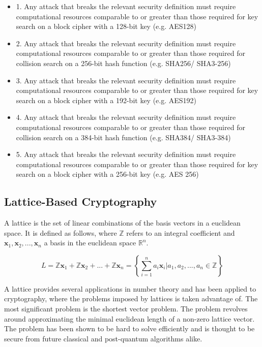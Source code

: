 \begin{itemize}
    \item 1. Any attack that breaks the relevant security definition must require computational resources comparable to or greater than those required for key search on a block cipher with a 128-bit key (e.g. AES128)
    \item 2. Any attack that breaks the relevant security definition must require computational resources comparable to or greater than those required for collision search on a 256-bit hash function (e.g. SHA256/ SHA3-256)
    \item 3. Any attack that breaks the relevant security definition must require computational resources comparable to or greater than those required for key search on a block cipher with a 192-bit key (e.g. AES192)
    \item 4. Any attack that breaks the relevant security definition must require computational resources comparable to or greater than those required for collision search on a 384-bit hash function (e.g. SHA384/ SHA3-384)
    \item 5. Any attack that breaks the relevant security definition must require computational resources comparable to or greater than those required for key search on a block cipher with a 256-bit key (e.g. AES 256)
\end{itemize}

\subsection{Lattice-Based Cryptography}

A lattice is the set of linear combinations of the basis vectors in a euclidean space. It is defined as follows, where $\mathbb{Z}$ refers to an integral coefficient and $\mathbf{x}_1,\mathbf{x}_2,...,\mathbf{x}_n$ a basis in the euclidean space $\mathbb{R}^n$\cite{bremner2012}.

$$
L=\mathbb{Z}\mathbf{x}_1+\mathbb{Z}\mathbf{x}_2+...+\mathbb{Z}\mathbf{x}_n=\left\{\sum_{i=1}^n a_i\mathbf{x}_i|a_1,a_2,...,a_n\in\mathbb{Z}\right\}
$$

\noindent A lattice provides several applications in number theory and has been applied to cryptography, where the problems imposed by lattices is taken advantage of\cite{bremner2012}. The most significant problem is the shortest vector problem. The problem revolves around approximating the minimal euclidean length of a non-zero lattice vector. The problem has been shown to be hard to solve efficiently and is thought to be secure from future classical and post-quantum algorithms alike\cite{sun2020}.

